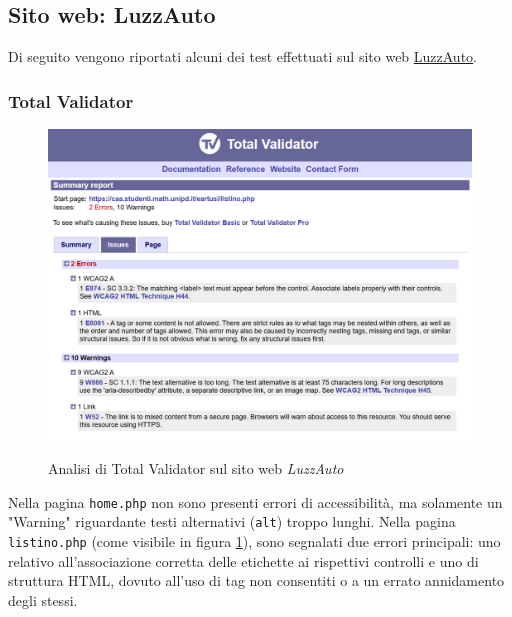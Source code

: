 \newpage
\subsection{Sito web: LuzzAuto}
\noindent Di seguito vengono riportati alcuni dei test effettuati sul sito web \href{https://caa.studenti.math.unipd.it/eartusi/index.php}{LuzzAuto}.
\subsubsection{Total Validator}
\begin{figure}[H]
    \centering
    \includegraphics[width=0.8\linewidth, alt={Screenshot dell'analisi di Total Validator sul sito web LuzzAuto}]{img/TV_luzzauto.png}
    \caption{Analisi di Total Validator sul sito web \textit{LuzzAuto}}\label{fig:TV_luzzauto}
\end{figure}

\noindent Nella pagina \texttt{home.php} non sono presenti errori di accessibilità, ma solamente un "Warning" riguardante testi alternativi (\texttt{alt}) troppo lunghi. 
Nella pagina \texttt{listino.php} (come visibile in figura \ref{fig:TV_luzzauto}), sono segnalati due errori principali: 
uno relativo all'associazione corretta delle etichette ai rispettivi controlli e uno di struttura HTML, dovuto all'uso di tag non consentiti o a un errato annidamento degli stessi. 

